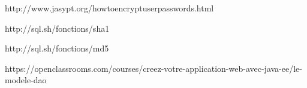 http://www.jasypt.org/howtoencryptuserpasswords.html

http://sql.sh/fonctions/sha1

http://sql.sh/fonctions/md5

https://openclassrooms.com/courses/creez-votre-application-web-avec-java-ee/le-modele-dao